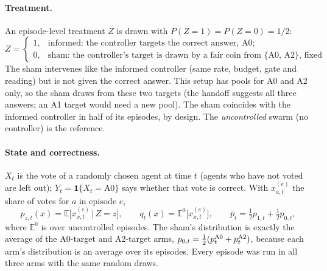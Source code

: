 \documentclass[10pt,a4paper]{article}
\begin{document}
\paragraph{Treatment.} An episode-level treatment $Z$ is drawn with $P(Z = 1) = P(Z = 0) = 1/2$:
\begin{equation}\label{eq:Z}
Z = \begin{cases} 1, & \text{informed: the controller targets the correct answer, A0;}\\
0, & \text{sham: the controller's target is drawn by a fair coin from \{A0, A2\}, fixed for the episode.}\end{cases}
\end{equation}
The sham intervenes like the informed controller (same rate, budget, gate and reading) but is not given the correct
answer. This setup has pools for A0 and A2 only, so the sham draws from these two targets (the handoff suggests all
three answers; an A1 target would need a new pool). The sham coincides with the informed controller in half of its
episodes, by design. The \emph{uncontrolled} swarm (no controller) is the reference.

\paragraph{State and correctness.} $X_t$ is the vote of a randomly chosen agent at time $t$ (agents who have not
voted are left out); $Y_t = \mathbf 1\{X_t = \text{A0}\}$ says whether that vote is correct. With $x^{(e)}_{a,t}$ the
share of votes for $a$ in episode $e$,
\begin{equation}\label{eq:p}
p_{z,t}(x) = \mathbb E\bigl[x^{(e)}_{x,t}\,\big|\,Z = z\bigr], \qquad q_t(x) = \mathbb E^{0}\bigl[x^{(e)}_{x,t}\bigr],
\qquad \bar p_t = \tfrac12 p_{1,t} + \tfrac12 p_{0,t},
\end{equation}
where $\mathbb E^0$ is over uncontrolled episodes. The sham's distribution is exactly the average of the A0-target
and A2-target arms, $p_{0,t} = \frac12(p^{\rm A0}_t + p^{\rm A2}_t)$, because each arm's distribution is an average
over its episodes. Every episode was run in all three arms with the same random draws.
\end{document}
